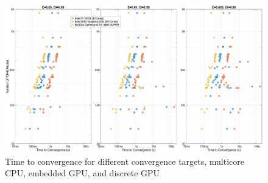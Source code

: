 \begin{figure}[p]
    \centering
    \includegraphics[width=1\textwidth]{4_casestudy/throughput/slides_nodes_vs_convergence.eps}
    \caption{Time to convergence for different convergence targets, multicore CPU, embedded GPU, and discrete GPU}
    \label{fig:nodes_vs_convergence}
\end{figure}



